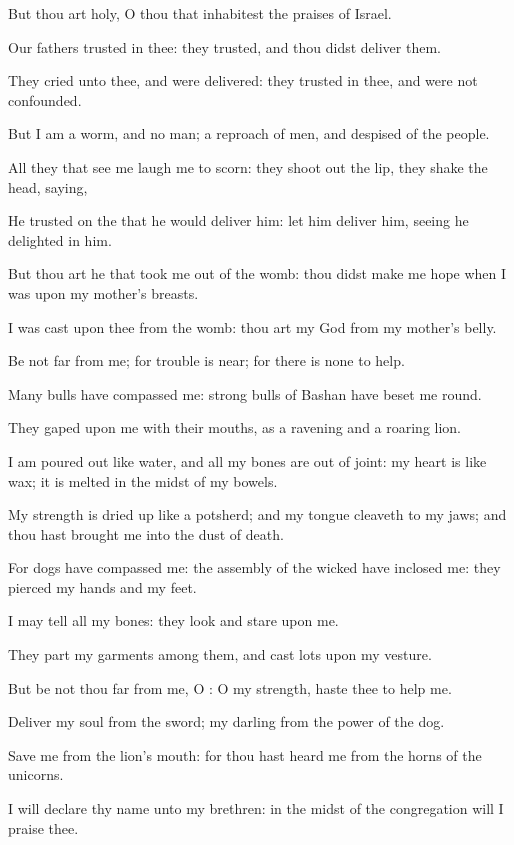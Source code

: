 \Verse But thou art holy, O thou that inhabitest the praises of Israel.

\Verse Our fathers trusted in thee: they trusted, and thou didst deliver them.

\Verse They cried unto thee, and were delivered: they trusted in thee, and were not confounded.

\Verse But I am a worm, and no man; a reproach of men, and despised of the people.

\Verse All they that see me laugh me to scorn: they shoot out the lip, they shake the head, saying,

\Verse He trusted on the \LORD that he would deliver him: let him deliver him, seeing he delighted in him.

\Verse But thou art he that took me out of the womb: thou didst make me hope when I was upon my mother's breasts.

\Verse I was cast upon thee from the womb: thou art my God from my mother's belly.

\Verse Be not far from me; for trouble is near; for there is none to help.

\Verse Many bulls have compassed me: strong bulls of Bashan have beset me round.

\Verse They gaped upon me with their mouths, as a ravening and a roaring lion.

\Verse I am poured out like water, and all my bones are out of joint: my heart is like wax; it is melted in the midst of my bowels.

\Verse My strength is dried up like a potsherd; and my tongue cleaveth to my jaws; and thou hast brought me into the dust of death.

\Verse For dogs have compassed me: the assembly of the wicked have inclosed me: they pierced my hands and my feet.

\Verse I may tell all my bones: they look and stare upon me.

\Verse They part my garments among them, and cast lots upon my vesture.

\Verse But be not thou far from me, O \LORD: O my strength, haste thee to help me.

\Verse Deliver my soul from the sword; my darling from the power of the dog.

\Verse Save me from the lion's mouth: for thou hast heard me from the horns of the unicorns.

\Verse I will declare thy name unto my brethren: in the midst of the congregation will I praise thee.

